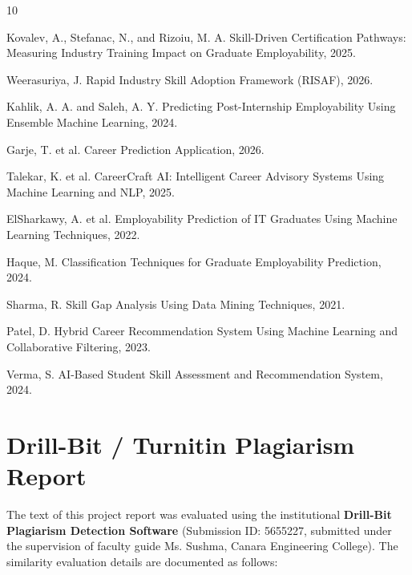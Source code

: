 \documentclass[12pt,a4paper]{report}
\begin{document}
\newpage
\pagestyle{plain}
\renewcommand{\bibname}{References}

\begin{thebibliography}{10}

Kovalev, A., Stefanac, N., and Rizoiu, M. A. Skill-Driven Certification Pathways: Measuring Industry Training Impact on Graduate Employability, 2025.

Weerasuriya, J. Rapid Industry Skill Adoption Framework (RISAF), 2026.

Kahlik, A. A. and Saleh, A. Y. Predicting Post-Internship Employability Using Ensemble Machine Learning, 2024.

Garje, T. et al. Career Prediction Application, 2026.

Talekar, K. et al. CareerCraft AI: Intelligent Career Advisory Systems Using Machine Learning and NLP, 2025.

ElSharkawy, A. et al. Employability Prediction of IT Graduates Using Machine Learning Techniques, 2022.

Haque, M. Classification Techniques for Graduate Employability Prediction, 2024.

Sharma, R. Skill Gap Analysis Using Data Mining Techniques, 2021.

Patel, D. Hybrid Career Recommendation System Using Machine Learning and Collaborative Filtering, 2023.

Verma, S. AI-Based Student Skill Assessment and Recommendation System, 2024.

\end{thebibliography}

\appendix
\chapter{Drill-Bit / Turnitin Plagiarism Report}
\par The text of this project report was evaluated using the institutional \textbf{Drill-Bit Plagiarism Detection Software} (Submission ID: 5655227, submitted under the supervision of faculty guide Ms. Sushma, Canara Engineering College). The similarity evaluation details are documented as follows:
\end{document}

